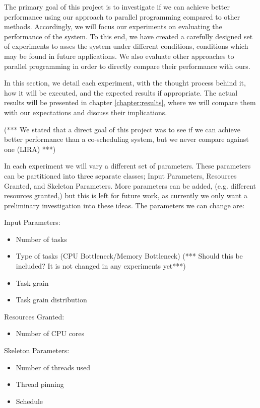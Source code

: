 The primary goal of this project is to investigate if we can achieve better performance using our approach to parallel programming compared to other methods. Accordingly, we will focus our experiments on evaluating the performance of the system. To this end, we have created a carefully designed set of experiments to asses the system under different conditions, conditions which may be found in future applications. We also evaluate other approaches to parallel programming in order to directly compare their performance with ours.

In this section, we detail each experiment, with the thought process behind it, how it will be executed, and the expected results if appropriate. The actual results will be presented in chapter \ref{chapter:results}, where we will compare them with our expectations and discuss their implications.

(*** We stated that a direct goal of this project was to see if we can achieve better performance than a co-scheduling system, but we never compare against one (LIRA) ***)

In each experiment we will vary a different set of parameters. These parameters can be partitioned into three separate classes; Input Parameters, Resources Granted, and Skeleton Parameters. More parameters can be added, (e.g. different resources granted,) but this is left for future work, as currently we only want a preliminary investigation into these ideas. The parameters we can change are:

Input Parameters:

\begin{itemize}
	\item Number of tasks
	\item Type of tasks (CPU Bottleneck/Memory Bottleneck) (*** Should this be included? It is not changed in any experiments yet***)
	\item Task grain
	\item Task grain distribution
\end{itemize}

Resources Granted:

\begin{itemize}
	\item Number of CPU cores
\end{itemize}

Skeleton Parameters:

\begin{itemize}
	\item Number of threads used
	\item Thread pinning
	\item Schedule
\end{itemize}

